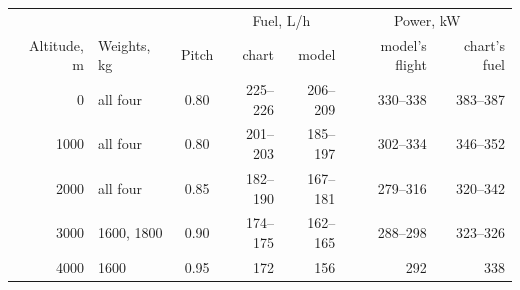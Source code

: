 \begin{tabular}{@{}r l c r r r r@{}}
\toprule
 & & & \multicolumn{2}{c}{Fuel, L/h} & \multicolumn{2}{c}{Power, kW} \\
Altitude, m & Weights, kg & Pitch & chart & model & model's flight & chart's fuel \\
\midrule
0 & all four & 0.80 & 225--226 & 206--209 & 330--338 & 383--387 \\
1000 & all four & 0.80 & 201--203 & 185--197 & 302--334 & 346--352 \\
2000 & all four & 0.85 & 182--190 & 167--181 & 279--316 & 320--342 \\
3000 & 1600, 1800 & 0.90 & 174--175 & 162--165 & 288--298 & 323--326 \\
4000 & 1600 & 0.95 & 172 & 156 & 292 & 338 \\
\bottomrule
\end{tabular}
